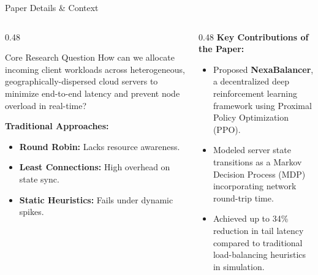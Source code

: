 \begin{frame}{Paper Details \& Context}
  
  \vspace{0.2cm}
  \begin{columns}[T]
    \begin{column}{0.48\textwidth}
      \begin{highlightbox}{Core Research Question}
        How can we allocate incoming client workloads across heterogeneous, geographically-dispersed cloud servers to minimize end-to-end latency and prevent node overload in real-time?
      \end{highlightbox}
      
      \vspace{0.1cm}
      \textbf{Traditional Approaches:}
      \begin{itemize}
        \item \textbf{Round Robin:} Lacks resource awareness.
        \item \textbf{Least Connections:} High overhead on state sync.
        \item \textbf{Static Heuristics:} Fails under dynamic spikes.
      \end{itemize}
    \end{column}
    
    \begin{column}{0.48\textwidth}
      \textbf{Key Contributions of the Paper:}
      \begin{itemize}
        \item Proposed \textbf{NexaBalancer}, a decentralized deep reinforcement learning framework using Proximal Policy Optimization (PPO).
        \item Modeled server state transitions as a Markov Decision Process (MDP) incorporating network round-trip time.
        \item Achieved up to 34\% reduction in tail latency compared to traditional load-balancing heuristics in simulation.
      \end{itemize}
    \end{column}
  \end{columns}
\end{frame}

